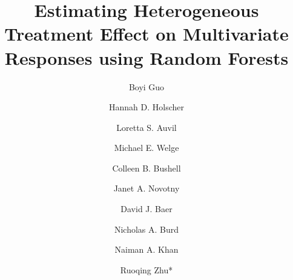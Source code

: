 \documentclass[smallextended]{svjour3}
\begin{document}
\title{Estimating Heterogeneous Treatment Effect on Multivariate Responses using Random Forests}

\author{Boyi Guo \and
        Hannah D. Holscher \and
        Loretta S. Auvil \and
        Michael E. Welge \and
        Colleen B. Bushell \and
        Janet A. Novotny \and 
        David J. Baer \and
        Nicholas A. Burd \and
        Naiman A. Khan \and
        Ruoqing Zhu*
        }






\end{document}
